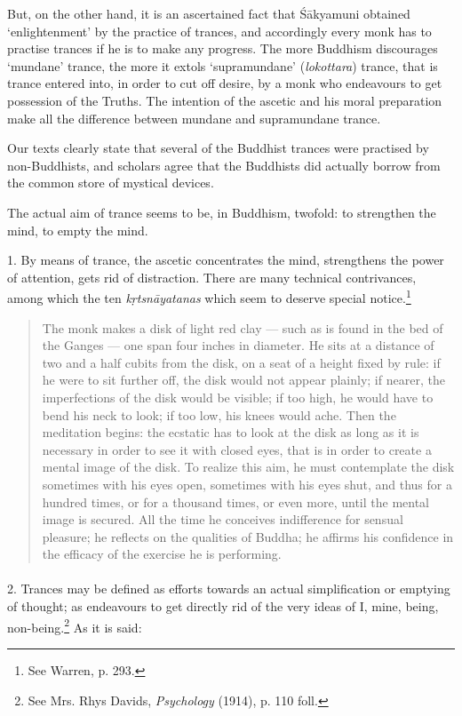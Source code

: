 \documentclass[a4paper, 11pt, oneside, english, landscape]{article}
\begin{document}
But, on the other hand, it is an ascertained fact that Śākyamuni obtained `enlightenment' by the practice of trances, and accordingly every monk has to practise trances if he is to make any progress. The more Buddhism discourages `mundane' trance, the more it extols `supramundane' (\emph{lokottara}) trance, that is trance entered into, in order to cut off desire, by a monk who endeavours to get possession of the Truths. The intention of the ascetic and his moral preparation make all the difference between mundane and supramundane trance.

Our texts clearly state that several of the Buddhist trances were practised by non-Buddhists, and scholars agree that the Buddhists did actually borrow from the common store of mystical devices.

The actual aim of trance seems to be, in Buddhism, twofold: to strengthen the mind, to empty the mind.

1. By means of trance, the ascetic concentrates the mind, strengthens the power of attention, gets rid of distraction. There are many technical contrivances, among which the ten \emph{kṛtsnāyatanas} which seem to deserve special notice.\footnote{See Warren, p. 293.}
\begin{quotation}
\small
The monk makes a disk of light red clay --- such as is found in the bed of the Ganges --- one span four inches in diameter. He sits at a distance of two and a half cubits from the disk, on a seat of a height fixed by rule: if he were to sit further off, the disk would not appear plainly; if nearer, the imperfections of the disk would be visible; if too high, he would have to bend his neck to look; if too low, his knees would ache. Then the meditation begins: the ecstatic has to look at the disk as long as it is necessary in order to see it with closed eyes, that is in order to create a mental image of the disk. To realize this aim, he must contemplate the disk sometimes with his eyes open, sometimes with his eyes shut, and thus for a hundred times, or for a thousand times, or even more, until the mental image is secured. All the time he conceives indifference for sensual pleasure; he reflects on the qualities of Buddha; he affirms his confidence in the efficacy of the exercise he is performing.
\end{quotation}
\paragraph{}
2. Trances may be defined as efforts towards an actual simplification or emptying of thought; as endeavours to get directly rid of the very ideas of I, mine, being, non-being.\footnote{See Mrs. Rhys Davids, \emph{Psychology} (1914), p. 110 foll.} As it is said:
\end{document}
